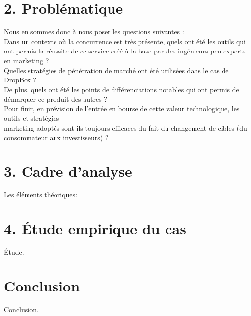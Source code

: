 \documentclass[a4paper, 10pt]{article}
\begin{document}
\section*{2. Probl\'ematique}
Nous en sommes donc à nous poser les questions suivantes :\\
Dans un contexte où la concurrence est très présente, quels ont été les outils qui ont permis la réussite de ce service
créé à la base par des ingénieurs peu experts en marketing ?\\
Quelles stratégies de pénétration de marché ont été utilisées dans le cas de DropBox ?\\
De plus, quels ont été les points de différenciations notables qui ont permis de démarquer ce produit des autres ?\\
Pour finir, en prévision de l'entrée en bourse de cette valeur technologique,
les outils et stratégies\\marketing adoptés sont-ils toujours efficaces du fait du changement de cibles
(du consommateur aux investisseurs) ?

\section*{3. Cadre d'analyse}
Les éléments théoriques:\\

\section*{4. Étude empirique du cas}
Étude.

\section*{Conclusion}
Conclusion.
\end{document}
